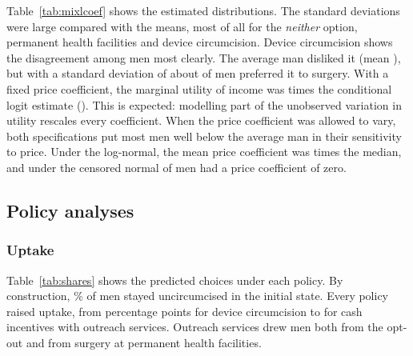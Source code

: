 \documentclass[11pt]{article}
\numberwithin{equation}{section}\numberwithin{figure}{section}\numberwithin{table}{section}
\begin{document}
\begin{table}[!htbp]
\centering
\caption{Fit of the conditional and mixed logit models (\mmcMXdraws{} draws per man).}\label{tab:mixlfit}
\small
{}
\end{table}

Table~\ref{tab:mixlcoef} shows the estimated distributions. The standard deviations were large compared with the means, most of all for the \emph{neither} option, permanent health facilities and device circumcision. Device circumcision shows the disagreement among men most clearly. The average man disliked it (mean \mmcMXdeviceMean), but with a standard deviation of \mmcMXdeviceSD{} about \mmcMXdeviceLike{} of men preferred it to surgery. With a fixed price coefficient, the marginal utility of income was \mmcMXscale{} times the conditional logit estimate (\mmcMXpriceFixed). This is expected: modelling part of the unobserved variation in utility rescales every coefficient. When the price coefficient was allowed to vary, both specifications put most men well below the average man in their sensitivity to price. Under the log-normal, the mean price coefficient was \mmcMXlognRatio{} times the median, and under the censored normal \mmcMXcensZero{} of men had a price coefficient of zero.

\begin{table}[!htbp]
\centering
\caption{Mixed logit with one price coefficient: mean and standard deviation (SD) of each utility coefficient across men (robust se).}\label{tab:mixlcoef}
\small
{}
\end{table}

\subsection{Policy analyses}
\subsubsection{Uptake}
Table~\ref{tab:shares} shows the predicted choices under each policy. By construction, \mmcoptoutShare\% of men stayed uncircumcised in the initial state. Every policy raised uptake, from \mmcPTwoUptakeChange{} percentage points for device circumcision to \mmcPFiveUptakeChange{} for cash incentives with outreach services. Outreach services drew men both from the opt-out and from surgery at permanent health facilities.
\end{document}
